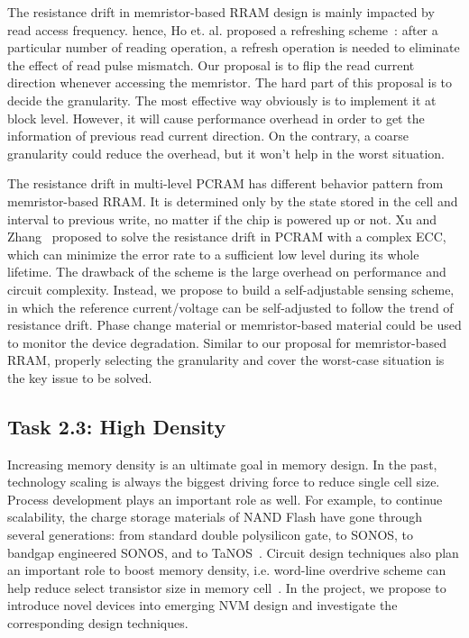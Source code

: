 The resistance drift in memristor-based RRAM design is mainly impacted by read access frequency. hence, Ho et. al. proposed a refreshing scheme~\cite{Ho09}: after a particular number of reading operation, a refresh operation is needed to eliminate the effect of read pulse mismatch. Our proposal is to flip the read current direction whenever accessing the memristor. The hard part of this proposal is to decide the granularity. The most effective way obviously is to implement it at block level. However, it will cause performance overhead in order to get the information of previous read current direction. On the contrary, a coarse granularity could reduce the overhead, but it won't help in the worst situation. 

The resistance drift in multi-level PCRAM has different behavior pattern from memristor-based RRAM. It is determined only by the state stored in the cell and interval to previous write, no matter if the chip is powered up or not. Xu and Zhang~\cite{Xu10} proposed to solve the resistance drift in PCRAM with a complex ECC, which can minimize the error rate to a sufficient low level during its whole lifetime. The drawback of the scheme is the large overhead on performance and circuit complexity. Instead, we propose to build a self-adjustable sensing scheme, in which the reference current/voltage can be self-adjusted to follow the trend of resistance drift. Phase change material or memristor-based material could be used to monitor the device degradation. Similar to our proposal for memristor-based RRAM, properly selecting the granularity and cover the worst-case situation is the key issue to be solved. 

\subsection{Task 2.3: High Density}
Increasing memory density is an ultimate goal in memory design. In the past, technology scaling is always the biggest driving force to reduce single cell size. Process development plays an important role as well. For example, to continue scalability, the charge storage materials of NAND Flash have gone through several generations: from standard double polysilicon gate, to SONOS, to bandgap engineered SONOS, and to TaNOS~\cite{Lu09}. Circuit design techniques also plan an important role to boost memory density, i.e. word-line overdrive scheme can help reduce select transistor size in memory cell~\cite{Li09}. In the project, we propose to introduce novel devices into emerging NVM design and investigate the corresponding design techniques.


